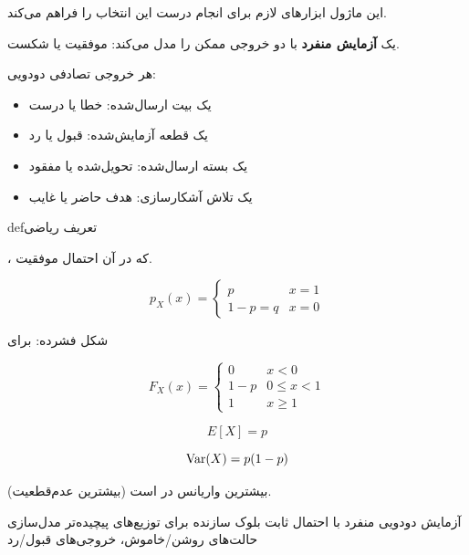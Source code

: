 این ماژول ابزارهای لازم برای انجام درست این انتخاب را فراهم می‌کند.



یک \textbf{آزمایش منفرد} با دو خروجی ممکن را مدل می‌کند: موفقیت یا شکست.


هر خروجی تصادفی دودویی:

\begin{itemize}
\tightlist
\item
  یک بیت ارسال‌شده: خطا یا درست
\item
  یک قطعه آزمایش‌شده: قبول یا رد
\item
  یک بسته ارسال‌شده: تحویل‌شده یا مفقود
\item
  یک تلاش آشکارسازی: هدف حاضر یا غایب
\end{itemize}

\begin{PSbox}[unbreakable]{def}{تعریف ریاضی}

، که در آن  احتمال موفقیت.

\end{PSbox}


\[p_X(x) = \begin{cases} p & x = 1 \\ 1-p = q & x = 0 \end{cases}\]

شکل فشرده:  برای 


\[F_X(x) = \begin{cases} 0 & x < 0 \\ 1-p & 0 \leq x < 1 \\ 1 & x \geq 1 \end{cases}\]


\[E[X] = p\]


\[\text{Var}(X) = p(1-p)\]

بیشترین واریانس در  است (بیشترین عدم‌قطعیت).


\lr{\PSyes{}} آزمایش دودویی منفرد با احتمال ثابت\PSbr{}\lr{\PSyes{}} بلوک سازنده برای توزیع‌های پیچیده‌تر\PSbr{}\lr{\PSyes{}} مدل‌سازی حالت‌های روشن/خاموش، خروجی‌های قبول/رد

